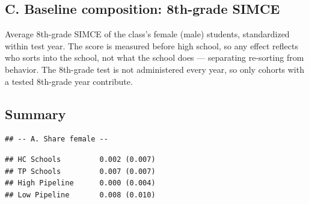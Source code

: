 \documentclass[
]{article}
\begin{document}
\hypertarget{c.-baseline-composition-8th-grade-simce}{%
\subsection{C. Baseline composition: 8th-grade
SIMCE}\label{c.-baseline-composition-8th-grade-simce}}

Average 8th-grade SIMCE of the class's female (male) students,
standardized within test year. The score is measured before high school,
so any effect reflects who sorts into the school, not what the school
does --- separating re-sorting from behavior. The 8th-grade test is not
administered every year, so only cohorts with a tested 8th-grade year
contribute.

\begin{table}[htbp]
   \caption{Baseline 8th-Grade SIMCE Composition by Gender}\label{tab: gender simce8 composition}
   \centerline{}
\end{table}

\hypertarget{summary}{%
\subsection{Summary}\label{summary}}

\begin{verbatim}
## -- A. Share female --
\end{verbatim}

\begin{verbatim}
## HC Schools         0.002 (0.007)
## TP Schools         0.007 (0.007)
## High Pipeline      0.000 (0.004)
## Low Pipeline       0.008 (0.010)
\end{verbatim}
\end{document}
